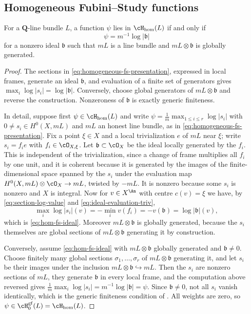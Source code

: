 \subsection{Homogeneous Fubini--Study functions}
\label{sec:ch35-hom-fs}

\begin{proposition}\label{prop:hom-fs-ideal}
For a $\mathbf Q$-line bundle $L$, a function $\psi$ lies in
$\cH_{\mathrm{hom}}(L)$ if and only if
\begin{equation}
\label{eq:hom-fs-ideal}
                    \psi=m^{-1}\log|\mathfrak b|
\end{equation}
for a nonzero ideal $\mathfrak b$ such that $mL$ is a line bundle and
$mL\otimes\mathfrak b$ is globally generated.
\end{proposition}

\begin{proof}
The sections in \eqref{eq:homogeneous-fs-presentation}, expressed in local
frames, generate an ideal $\mathfrak b$, and evaluation of a finite set of
generators gives
$\max_i\log|s_i|=\log|\mathfrak b|$.  Conversely, choose global
generators of $mL\otimes\mathfrak b$ and reverse the construction.
Nonzeroness of $\mathfrak b$ is exactly generic finiteness.

In detail, suppose first $\psi\in\cH_{\mathrm{hom}}(L)$ and write
$\psi=\frac1m\max_{1\leq i\leq r}\log|s_i|$ with
$0\neq s_i\in H^0(X,mL)$ and $mL$ an honest line bundle, as in
\eqref{eq:homogeneous-fs-presentation}.  Fix a point $\xi\in X$ and a
local trivialization $e$ of $mL$ near $\xi$; write
$s_i=f_ie$ with $f_i\in\cO_{X,\xi}$.  Let
$\mathfrak b\subset\cO_X$ be the ideal locally generated by the $f_i$.
This is independent of the trivialization, since a change of frame
multiplies all $f_i$ by one unit, and it is coherent because it is
generated by the images of the finite-dimensional space spanned by the
$s_i$ under the evaluation map
$H^0(X,mL)\otimes\cO_X\to mL$, twisted by $-mL$.  It is nonzero because
some $s_i$ is nonzero and $X$ is integral.  Now for
$v\in X^{\An}$ with centre $c(v)=\xi$ we have, by
\eqref{eq:section-log-value} and \eqref{eq:ideal-evaluation-triv},
\[
 \max_i\log|s_i|(v)=-\min_iv(f_i)=-v(\mathfrak b)
 =\log|\mathfrak b|(v),
\]
which is \eqref{eq:hom-fs-ideal}.  Moreover
$mL\otimes\mathfrak b$ is globally generated, because the $s_i$
themselves are global sections of $mL\otimes\mathfrak b$ generating it by
construction.

Conversely, assume \eqref{eq:hom-fs-ideal} with
$mL\otimes\mathfrak b$ globally generated and $\mathfrak b\neq0$.
Choose finitely many global sections $\sigma_1,\ldots,\sigma_r$ of
$mL\otimes\mathfrak b$ generating it, and let $s_i$ be their images
under the inclusion $mL\otimes\mathfrak b\hookrightarrow mL$.  Then the
$s_i$ are nonzero sections of $mL$, they generate
$\mathfrak b$ in every local frame, and the computation above reversed
gives $\frac1m\max_i\log|s_i|=m^{-1}\log|\mathfrak b|=\psi$.  Since
$\mathfrak b\neq0$, not all $s_i$ vanish identically, which is the
generic finiteness condition of .  All weights are
zero, so $\psi\in\cH^{\mathrm{gf}}_0(L)=\cH_{\mathrm{hom}}(L)$.
\end{proof}

